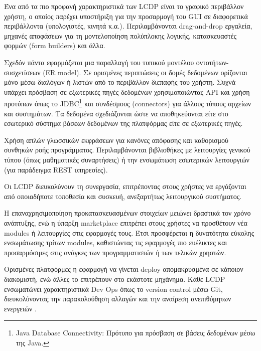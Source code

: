             \begin{description}
                \setlength\itemsep{-0.25em}
                \item[Γραφικός σχεδιαστής (GUI Designer) --] Ένα από τα πιο προφανή χαρακτηριστικά των LCDP είναι το γραφικό περιβάλλον χρήστη, ο οποίος παρέχει υποστήριξη για την προσαρμογή του GUI σε διαφορετικά περιβάλλοντα (υπολογιστές, κινητά κ.α.). Περιλαμβάνονται drag-and-drop εργαλεία, μηχανές αποφάσεων για τη μοντελοποίηση πολύπλοκης λογικής, κατασκευαστές φορμών (form builders) και άλλα.
                \item[Μοντελοποίηση δομών δεδομένων --] Σχεδόν πάντα εφαρμόζεται μια παραλλαγή του τυπικού μοντέλου οντοτήτων-συσχετίσεων (ER model). Σε ορισμένες περιπτώσεις οι δομές δεδομένων ορίζονται μόνο μέσω διαλόγων ή λιστών από το περιβάλλον διεπαφής του χρήστη. Συχνά υπάρχει πρόσβαση σε εξωτερικές πηγές δεδομένων χρησιμοποιώντας API και χρήση προτύπων όπως το JDBC\footnote{Java Database Connectivity: Πρότυπο για πρόσβαση σε βάσεις δεδομένων μέσω της Java.} και συνδέσμους (connectors) για άλλους τύπους αρχείων και συστημάτων. Τα δεδομένα σχεδιάζονται ώστε να αποθηκεύονται είτε στο εσωτερικό σύστημα βάσεων δεδομένων της πλατφόρμας είτε σε εξωτερικές πηγές.
                \item[Ροή προγράμματος --] Χρήση απλών γλωσσικών εκφράσεων για κανόνες απόφασης και καθορισμού συνθηκών ροής προγράμματος. Περιλαμβάνονται βιβλιοθήκες με λειτουργίες γενικού τύπου (όπως μαθηματικές συναρτήσεις) ή την ενσωμάτωση εσωτερικών λειτουργιών (για παράδειγμα REST υπηρεσίες).
                \item[Φορητότητα και συνεργασία --] Οι LCDP διευκολύνουν τη συνεργασία, επιτρέποντας στους χρήστες να εργάζονται από οποιαδήποτε τοποθεσία και συσκευή, ανεξαρτήτως λειτουργικού συστήματος.
                \item[Επεκτασιμότητα --] Η επαναχρησιμοποίηση προκατασκευασμένων στοιχείων μειώνει δραστικά τον χρόνο ανάπτυξης, ενώ η ύπαρξη marketplace επιτρέπει στους χρήστες να προσθέτουν νέα modules ή λειτουργίες στις εφαρμογές τους. Έτσι προσφέρεται η δυνατότητα εύκολης ενσωμάτωσης τρίτων modules, καθιστώντας τις εφαρμογές πιο ευέλικτες και προσαρμόσιμες στις ανάγκες των προγραμματιστών ή των τελικών χρηστών.
                \item[Εύκολη διάθεση και έλεγχος έκδοσης --] Ορισμένες πλατφόρμες η εφαρμογή να γίνεται deploy απομακρυσμένα σε κάποιον διακομιστή, ενώ άλλες το επιτρέπουν στο εκάστοτε μηχάνημα. Κάθε LCDP ενσωματώνει χαρακτηριστικά Dev Ops όπως το version control μέσω Git, διευκολύνοντας την παρακολούθηση αλλαγών και την αναίρεση ανεπιθύμητων ενεργειών \cite{Bock2021}.
            \end{description}

